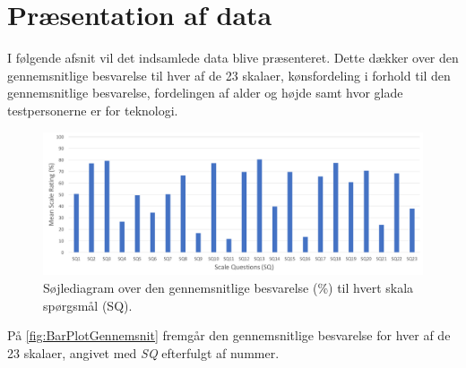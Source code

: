 \section{Præsentation af data}
\label{TestAfSkalaPraesentationAfData}
%
I følgende afsnit vil det indsamlede data blive præsenteret. Dette dækker over den gennemsnitlige besvarelse til hver af de 23 skalaer, kønsfordeling i forhold til den gennemsnitlige besvarelse, fordelingen af alder og højde samt hvor glade testpersonerne er for teknologi. 
%
\begin{figure}[H]
\centering
\includegraphics[width = \textwidth]{Figure/DatabehandlingSkalaer/DataPresentation/MeanBarplot} 
\caption{Søjlediagram over den gennemsnitlige besvarelse (\%) til hvert skala spørgsmål (SQ).}
\label{fig:BarPlotGennemsnit}
\end{figure}
\noindent
%
På \autoref{fig:BarPlotGennemsnit} fremgår den gennemsnitlige besvarelse for hver af de 23 skalaer, angivet med \textit{SQ} efterfulgt af nummer.

